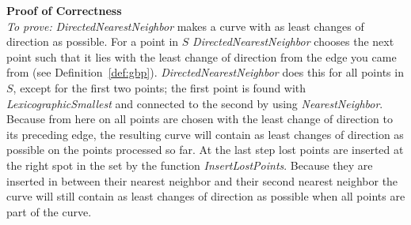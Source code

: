      \noindent\textbf{Proof of Correctness}\\
     \textit{To prove:} \textit{DirectedNearestNeighbor} makes a curve with as least changes of direction as possible.
      For a point in $S$ \textit{DirectedNearestNeighbor} chooses the next point such that it lies with the least change of direction from the edge you came from (see Definition~\ref{def:gbp}). \textit{DirectedNearestNeighbor} does this for all points in $S$, except for the first two points; the first point is found with \textit{LexicographicSmallest} and connected to the second by using \textit{NearestNeighbor}. Because from here on all points are chosen with the least change of direction to its preceding edge, the resulting curve will contain as least changes of direction as possible on the points processed so far. At the last step lost points are inserted at the right spot in the set by the function \textit{InsertLostPoints}. Because they are inserted in between their nearest neighbor and their second nearest neighbor the curve will still contain as least changes of direction as possible when all points are part of the curve.\\

